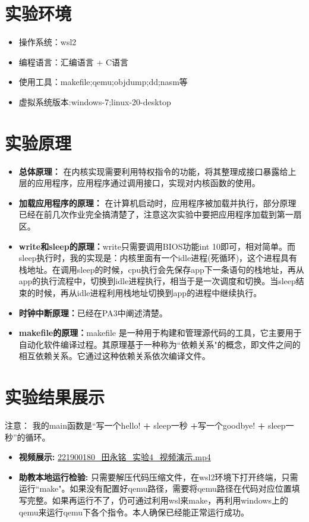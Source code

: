 \documentclass{LabReport}
\begin{document}
	\section{实验环境}
	
	\begin{itemize}
		\item 操作系统：wsl2
		\item 编程语言：汇编语言 + C语言
		\item 使用工具：makefile;qemu;objdump;dd;nasm等
		\item 虚拟系统版本:windows-7;linux-20-desktop
	\end{itemize}
	
	\section{实验原理}
	\begin{itemize}
		\item \textbf{总体原理：} 在内核实现需要利用特权指令的功能，将其整理成接口暴露给上层的应用程序，应用程序通过调用接口，实现对内核函数的使用。
		
		\item \textbf{加载应用程序的原理：} 在计算机启动时，应用程序被加载并执行，部分原理已经在前几次作业完全搞清楚了，注意这次实验中要把应用程序加载到第一扇区。
		
		\item \textbf{write和sleep的原理：}write只需要调用BIOS功能int 10即可，相对简单。而sleep执行时，我的实现是：内核里面有一个idle进程(死循环)，这个进程具有栈地址。在调用sleep的时候，cpu执行会先保存app下一条语句的栈地址，再从app的执行流程中，切换到idle进程执行，相当于是一次调度和切换。当sleep结束的时候，再从idle进程利用栈地址切换到app的进程中继续执行。
		
		\item \textbf{时钟中断原理：}已经在PA3中阐述清楚。
		
		\item \textbf{makefile的原理：}makefile 是一种用于构建和管理源代码的工具，它主要用于自动化软件编译过程。其原理基于一种称为``依赖关系"的概念，即文件之间的相互依赖关系。它通过这种依赖关系依次编译文件。
	\end{itemize}
	
	\section{实验结果展示}
	{\color{red} 注意：} 我的main函数是``写一个hello! \textbf{+} sleep一秒 \textbf{+}写一个goodbye! \textbf{+} sleep一秒”的循环。
	\begin{itemize}
		\item \textbf{视频展示: } \href{https://box.nju.edu.cn/f/a5787150680c45f38938/}{\color{red} 221900180\_田永铭\_实验4\_视频演示.mp4}
		\item \textbf{助教本地运行检验: } 只需要解压代码压缩文件，在wsl2环境下打开终端，只需运行``make"。如果没有配置好qemu路径，需要将qemu路径在代码对应位置填写完整。如果再运行不了，仍可通过利用wsl来make，再利用windows上的qemu来运行qemu下各个指令。本人确保已经能正常运行成功。
	\end{itemize}
\end{document}
